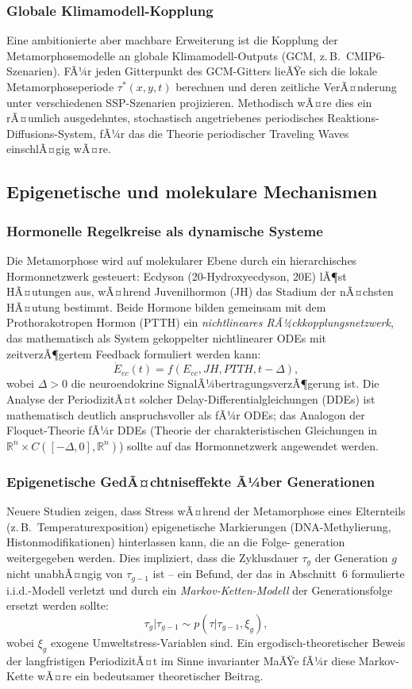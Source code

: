 ﻿\documentclass[12pt, a4paper]{article}
\theoremstyle{definition}
\newcommand{\R}{\mathbb{R}}
\begin{document}
\subsubsection{Globale Klimamodell-Kopplung}
Eine ambitionierte aber machbare Erweiterung ist die Kopplung der Metamorphosemodelle
an globale Klimamodell-Outputs (GCM, z.\,B.\ CMIP6-Szenarien). FÃ¼r jeden
Gitterpunkt des GCM-Gitters lieÃŸe sich die lokale Metamorphoseperiode $\tau^*(x,y,t)$
berechnen und deren zeitliche VerÃ¤nderung unter verschiedenen SSP-Szenarien
projizieren. Methodisch wÃ¤re dies ein rÃ¤umlich ausgedehntes, stochastisch
angetriebenes periodisches Reaktions-Diffusions-System, fÃ¼r das die Theorie
periodischer Traveling Waves einschlÃ¤gig wÃ¤re.

\subsection{Epigenetische und molekulare Mechanismen}

\subsubsection{Hormonelle Regelkreise als dynamische Systeme}
Die Metamorphose wird auf molekularer Ebene durch ein hierarchisches
Hormonnetzwerk gesteuert: Ecdyson (20-Hydroxyecdyson, 20E) lÃ¶st HÃ¤utungen aus,
wÃ¤hrend Juvenilhormon (JH) das Stadium der nÃ¤chsten HÃ¤utung bestimmt. Beide
Hormone bilden gemeinsam mit dem Prothorakotropen Hormon (PTTH) ein
\emph{nichtlineares RÃ¼ckkopplungsnetzwerk}, das mathematisch als System
gekoppelter nichtlinearer ODEs mit zeitverzÃ¶gertem Feedback formuliert werden
kann:
\[
  \dot{E}_{ec}(t) = f(E_{ec}, JH, PTTH, t-\Delta),
\]
wobei $\Delta > 0$ die neuroendokrine SignalÃ¼bertragungsverzÃ¶gerung ist. Die Analyse
der PeriodizitÃ¤t solcher Delay-Differentialgleichungen (DDEs) ist mathematisch
deutlich anspruchsvoller als fÃ¼r ODEs; das Analogon der Floquet-Theorie fÃ¼r DDEs
(Theorie der charakteristischen Gleichungen in $\R^n \times C([-\Delta, 0], \R^n)$)
sollte auf das Hormonnetzwerk angewendet werden.

\subsubsection{Epigenetische GedÃ¤chtniseffekte Ã¼ber Generationen}
Neuere Studien \cite{Jablonka2005} zeigen, dass Stress wÃ¤hrend der Metamorphose
eines Elternteils (z.\,B.\ Temperaturexposition) epigenetische Markierungen
(DNA-Methylierung, Histonmodifikationen) hinterlassen kann, die an die Folge-
generation weitergegeben werden. Dies impliziert, dass die Zyklusdauer $\tau_g$
der Generation $g$ nicht unabhÃ¤ngig von $\tau_{g-1}$ ist -- ein Befund, der
das in Abschnitt~6 formulierte i.i.d.-Modell verletzt und durch ein
\emph{Markov-Ketten-Modell} der Generationsfolge ersetzt werden sollte:
\[
  \tau_g | \tau_{g-1} \sim p(\tau | \tau_{g-1}, \xi_g),
\]
wobei $\xi_g$ exogene Umweltstress-Variablen sind. Ein ergodisch-theoretischer
Beweis der langfristigen PeriodizitÃ¤t im Sinne invarianter MaÃŸe fÃ¼r diese
Markov-Kette wÃ¤re ein bedeutsamer theoretischer Beitrag.
\end{document}
